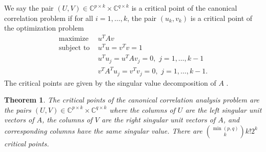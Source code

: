 \documentclass[12pt]{extarticle}
\newtheorem{theorem}{Theorem}
\theoremstyle{definition}
\numberwithin{theorem}{section}
\newcommand{\CC}{\mathbb{C}}
\begin{document}
We say the pair $(U, V) \in \CC^{p \times k} \times \CC^{q \times k}$ is a critical point of the canonical correlation problem if for all $i = 1, \ldots, k$, the pair $(u_k, v_k)$ is a critical point of the optimization problem 
\begin{align}\label{eqn:ccabrokendown}
    \textrm{maximize } &u^T A v\\\nonumber
    \textrm{subject to } &u^Tu = v^Tv = 1\\\nonumber
    &u^Tu_j = u^TAv_j = 0, \,\, j=1, \ldots, k-1\\\nonumber
    &v^TA^Tu_j = v^Tv_j = 0,  \,\, j =1, \ldots, k-1.
\end{align}
The critical points are given by the singular value decomposition of $A$ \cite{CG22}. 
\begin{theorem} \label{thm:canonical}
The critical points of the canonical correlation analysis problem are the pairs $(U, V) \in \CC^{p \times k} \times \CC^{q \times k}$
where the columns of $U$ are the left singular unit vectors of $A$, the columns of $V$ are the right singular unit vectors of $A$, and  corresponding columns have the same singular value.
There are $\binom{\min(p, q)}{k} k! 2^k $ critical points.
\end{theorem}
\end{document}
